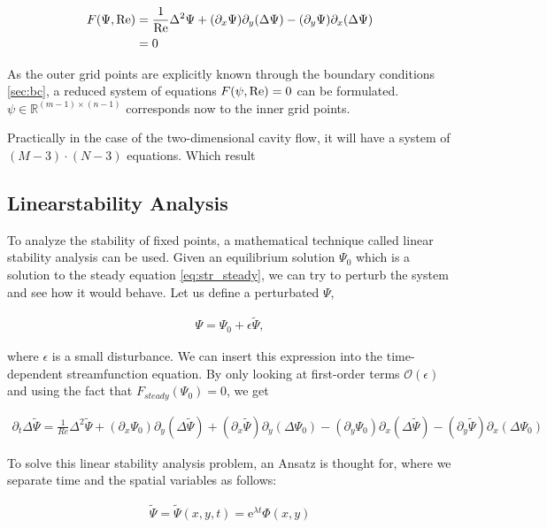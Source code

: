 \begin{align}
  F(\Psi, \mathrm{Re}) & = \frac{1}{\mathrm{Re}}\Delta^2 \Psi +
    (\partial_x \Psi) \partial_y(\Delta \Psi) -
    (\partial_y \Psi) \partial_x(\Delta \Psi) \nonumber \\
  & =  0 \label{eq:str_steady}
\end{align}

As the outer grid points are explicitly known through the boundary conditions
\ref{sec:bc}, a reduced system of equations $F(\psi, \mathrm{Re}) = 0$ can be
formulated. $\psi \in \mathbb{R}^{(m-1)\times(n-1)} $ corresponds now to the
inner grid points. 

Practically in the case of the two-dimensional cavity flow, it will have a
system of $(M-3) \cdot (N-3)$ equations. Which result

\subsection{Linearstability Analysis}

To analyze the stability of fixed points, a mathematical technique called
linear stability analysis can be used. Given an equilibrium solution $\Psi_0$
which is a solution to the steady equation \ref{eq:str_steady}, we can try to
perturb the system and see how it would behave. Let us define a perturbated
$\Psi$,

\begin{align}
\Psi = \Psi_0 + \epsilon \tilde{\Psi},
\end{align}

where $\epsilon$ is a small disturbance. We can insert this expression into the
time-dependent streamfunction equation. By only looking at first-order terms
$\mathcal{O}(\epsilon)$ and using the fact that $F_{steady}(\Psi_0) = 0$, we
get

\begin{align}
\partial_t \Delta \tilde{\Psi} = \frac{1}{Re} \Delta^2 \tilde{\Psi}
  + (\partial_x \Psi_0) \partial_y (\Delta \tilde{\Psi})
  + (\partial_x \tilde{\Psi}) \partial_y (\Delta \Psi_0)
  - (\partial_y \Psi_0) \partial_x (\Delta \tilde{\Psi})
  - (\partial_y \tilde{\Psi}) \partial_x (\Delta \Psi_0)
\label{eq:str_pert}
\end{align}

To solve this linear stability analysis problem, an Ansatz is thought for,
where we separate time and the spatial variables as follows: 

\begin{align}
  \tilde{\Psi} = \tilde{\Psi}(x,y,t) = \mathrm{e}^{\lambda t} \Phi(x,y)
\end{align}

